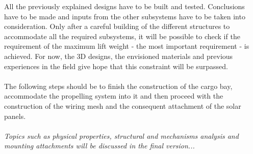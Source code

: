 All the previously explained designs have to be built and tested. Conclusions have to be made and inputs from the other subsystems have to be taken into consideration. Only after a careful building of the different structures to accommodate all the required subsystems, it will be possible to check if the requirement of the maximum lift weight - the most important requirement - is achieved. For now, the 3D designs, the envisioned materials and previous experiences in the field give hope that this constraint will be surpassed.
\\
\\
The following steps should be to finish the construction of the cargo bay, accommodate the propelling system into it and then proceed with the construction of the wiring mesh and the consequent attachment of the solar panels.
\\
\\
\textit{Topics such as physical properties, structural and mechanisms analysis and mounting attachments will be discussed in the final version...}
%
%
%
%
%
%
%
%
%
%
%
